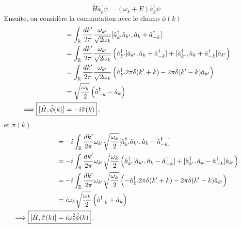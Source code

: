 \documentclass{article}
\numberwithin{equation}{section}
\theoremstyle{solution}
\begin{document}
\begin{equation}
        \hat{H}\hat{a}^{\dagger}_k \psi = (\omega_k+ E)\hat{a}^{\dagger}_k \psi
\end{equation} 
Ensuite, on considère la commutation avec le champ $\phi(k)$
\begingroup
\allowdisplaybreaks
\begin{align*}
        [\hat{H}, \hat{\phi}(k)] &=\int_{\mathbb{R}} \frac{dk'}{2\pi}  \frac{\omega_{k'}}{\sqrt{2\omega_{k}}}[\hat{a}^{\dagger}_{k'} \hat{a}_{k'}, \hat{a}_{k} + \hat{a}^{\dagger}_{-k}] \\
        &= \int_{\mathbb{R}} \frac{dk'}{2\pi} 
         \frac{\omega_{k'}}{\sqrt{2\omega_{k}}}
        \left(  
                \hat{a}^{\dagger}_{k'}[\hat{a}_{k'}, \hat{a}_{k} + \hat{a}^{\dagger}_{-k}] 
                + [\hat{a}^{\dagger}_{k'} , \hat{a}_{k} + \hat{a}^{\dagger}_{-k}]\hat{a}_{k'} 
        \right)\\
        &= \int_{\mathbb{R}} \frac{dk'}{2\pi} 
         \frac{\omega_{k'}}{\sqrt{2\omega_{k}}}
        \left(  
                \hat{a}^{\dagger}_{k'} 2\pi\delta(k' + k) 
                - 2\pi \delta(k' - k)\hat{a}_{k'}
        \right)\\
        &= \sqrt{\frac{\omega_k}{2}} \left(  \hat{a}^{\dagger}_{-k}   - \hat{a}_{k} \right) \\
        \implies \Aboxed{[\hat{H}, \hat{\phi}(k)]  &= -i\hat{\pi}(k)}\, ,
\end{align*}
\endgroup
et $\pi(k)$
\begin{align*}
        [\hat{H}, \hat{\pi}(k)] &= -i \int_{\mathbb{R}} \frac{dk'}{2\pi} \omega_{k'} \sqrt{\frac{\omega_k}{2}}[\hat{a}^{\dagger}_{k'} \hat{a}_{k'}, \hat{a}_{k} - \hat{a}^{\dagger}_{-k}] \\
        &= -i \int_{\mathbb{R}} \frac{dk'}{2\pi} 
\omega_{k'} \sqrt{\frac{\omega_k}{2}}
        \left(  
                \hat{a}^{\dagger}_{k'}[\hat{a}_{k'}, \hat{a}_{k} - \hat{a}^{\dagger}_{-k}] 
                + [\hat{a}^{\dagger}_{k'} , \hat{a}_{k} - \hat{a}^{\dagger}_{-k}]\hat{a}_{k'} 
        \right)\\
        &=-i \int_{\mathbb{R}} \frac{dk'}{2\pi} 
\omega_{k'} \sqrt{\frac{\omega_k}{2}}
        \left(  
                -\hat{a}^{\dagger}_{k'} 2\pi\delta(k' + k) 
                - 2\pi \delta(k'- k)\hat{a}_{k'}
        \right)\\
        &= i \omega_k\sqrt{\frac{\omega_k}{2}} \left(  \hat{a}^{\dagger}_{-k}  + \hat{a}_{k} \right) \\
        \implies \Aboxed{[\hat{H}, \hat{\pi}(k)]  &= i\omega^{2}_k\hat{\phi}(k)}\, . 
\end{align*}
\end{document}
